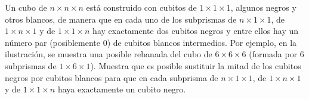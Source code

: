 Un cubo de $n \times n \times n$ está construido con cubitos de $1 \times 1 \times 1$, algunos negros y otros blancos, de manera que en cada uno de los subprismas de $n\times 1\times 1$, de $1\times n\times 1$ y de $1\times 1\times n$ hay exactamente dos cubitos negros y entre ellos hay un número par (posiblemente $0$) de cubitos blancos intermedios. Por ejemplo, en la ilustración, se muestra una posible rebanada del cubo de $6 \times 6 \times 6$ (formada por $6$ subprismas de $1 \times 6 \times 1$). Muestra que es posible sustituir la mitad de los cubitos negros por cubitos blancos para que en cada subprisma de $n \times 1 \times 1$, de $1 \times n \times 1$ y de $1 \times 1 \times n$ haya exactamente un cubito negro.